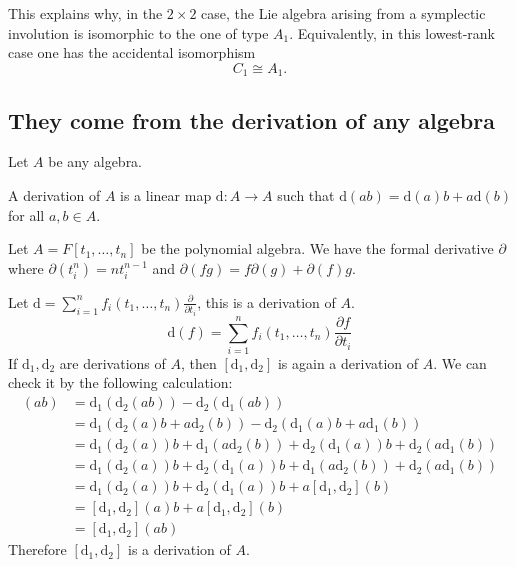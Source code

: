 \begin{remark}
    This explains why, in the $2\times 2$ case, the Lie algebra arising from a symplectic involution is isomorphic to the one of type $A_{1}$. Equivalently, in this lowest-rank case one has the accidental isomorphism
    \[
        C_{1}\cong A_{1}.
    \]
\end{remark}

\subsection{They come from the derivation of any algebra}

Let $A$ be any algebra.

\begin{definition}
    A derivation of $A$ is a linear map $\mathrm{d}: A \to A$ such that $\mathrm{d}(ab)=\mathrm{d}(a)b+a\mathrm{d}(b)$ for all $a,b \in A$.
\end{definition}

\begin{example}
    Let $A=F[t_1,\ldots ,t_n]$ be the polynomial algebra. We have the formal derivative $ \partial $ where $\partial(t_i^n)=nt_i^{n-1}$ and $\partial(fg)=f\partial(g)+\partial(f)g$.

    Let $\mathrm{d}=\sum_{i=1}^n f_i(t_1,\ldots ,t_n) \frac{\partial}{\partial t_i} $, this is a derivation of $A$.
    \[
        \mathrm{d}(f)=\sum_{i=1}^n f_i(t_1,\ldots ,t_n) \frac{\partial f}{\partial t_i}
    \]
    If $\mathrm{d}_1,\mathrm{d}_2$ are derivations of $A$, then $[\mathrm{d}_1,\mathrm{d}_2]$ is again a derivation of $A$. We can check it by the following calculation:
    \begin{align*}
        [\mathrm{d}_1,\mathrm{d}_2](ab) & =\mathrm{d}_1(\mathrm{d}_2(ab))-\mathrm{d}_2(\mathrm{d}_1(ab))                                                               \\
                                        & =\mathrm{d}_1(\mathrm{d}_2(a)b+a\mathrm{d}_2(b))-\mathrm{d}_2(\mathrm{d}_1(a)b+a\mathrm{d}_1(b))                             \\
                                        & =\mathrm{d}_1(\mathrm{d}_2(a))b+\mathrm{d}_1(a\mathrm{d}_2(b))+\mathrm{d}_2(\mathrm{d}_1(a))b+\mathrm{d}_2(a\mathrm{d}_1(b)) \\
                                        & =\mathrm{d}_1(\mathrm{d}_2(a))b+\mathrm{d}_2(\mathrm{d}_1(a))b+\mathrm{d}_1(a\mathrm{d}_2(b))+\mathrm{d}_2(a\mathrm{d}_1(b)) \\
                                        & =\mathrm{d}_1(\mathrm{d}_2(a))b+\mathrm{d}_2(\mathrm{d}_1(a))b+a[\mathrm{d}_1,\mathrm{d}_2](b)                               \\
                                        & =[\mathrm{d}_1,\mathrm{d}_2](a)b+a[\mathrm{d}_1,\mathrm{d}_2](b)                                                             \\
                                        & =[\mathrm{d}_1,\mathrm{d}_2](ab)
    \end{align*}
    Therefore $[\mathrm{d}_1,\mathrm{d}_2]$ is a derivation of $A$.
\end{example}

